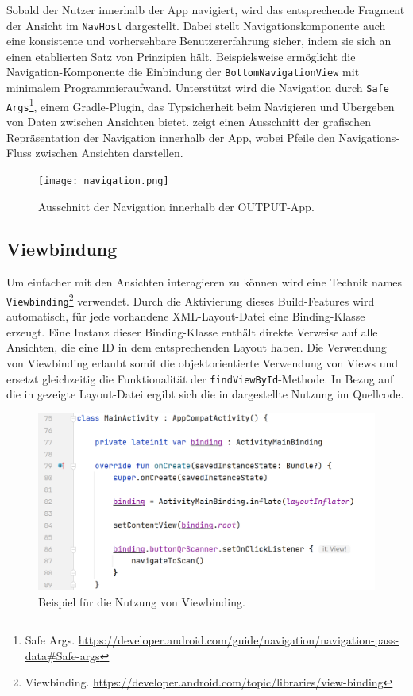 Sobald der Nutzer innerhalb der App navigiert, wird das entsprechende Fragment der Ansicht im \texttt{NavHost} dargestellt. Dabei stellt Navigationskomponente auch eine konsistente und vorhersehbare Benutzererfahrung sicher, indem sie sich an einen etablierten Satz von Prinzipien hält. Beispielsweise ermöglicht die Navigation-Komponente die Einbindung der \texttt{BottomNavigationView} mit minimalem Programmieraufwand. Unterstützt wird die Navigation durch \texttt{Safe Args}\footnote{Safe Args. \url{https://developer.android.com/guide/navigation/navigation-pass-data\#Safe-args}}, einem Gradle-Plugin, das Typsicherheit beim Navigieren und Übergeben von Daten zwischen Ansichten bietet.  zeigt einen Ausschnitt der grafischen Repräsentation der Navigation innerhalb der App, wobei Pfeile den Navigations-Fluss zwischen Ansichten darstellen.   

\begin{figure}[H]
  \texttt{[image: navigation.png]}
  \caption{Ausschnitt der Navigation innerhalb der OUTPUT-App.}\label{fig:navigation}
\end{figure}


\subsection{Viewbindung}\label{subsec:viewbinding}

Um einfacher mit den Ansichten interagieren zu können wird eine Technik names \texttt{Viewbinding}\footnote{Viewbinding. \url{https://developer.android.com/topic/libraries/view-binding}} verwendet. Durch die Aktivierung dieses Build-Features wird automatisch, für jede vorhandene XML-Layout-Datei eine Binding-Klasse erzeugt. Eine Instanz dieser Binding-Klasse enthält direkte Verweise auf alle Ansichten, die eine ID in dem entsprechenden Layout haben. Die Verwendung von Viewbinding erlaubt somit die objektorientierte Verwendung von Views und ersetzt gleichzeitig die Funktionalität der \texttt{findViewById}-Methode. In Bezug auf die in  gezeigte Layout-Datei ergibt sich die in  dargestellte Nutzung im Quellcode.

\begin{figure}[H]
    \includegraphics[width=1\linewidth]{viewbinding.png}
    \caption{Beispiel für die Nutzung von Viewbinding.}\label{fig:viewbinding}
\end{figure}

